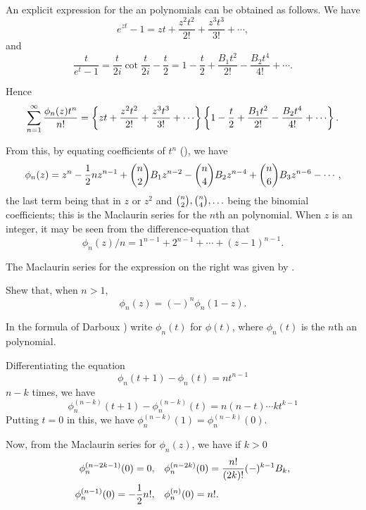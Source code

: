 An explicit expression for the \Bernoulli an polynomials can be obtained
as follows. We have
$$
e^{zt} - 1
=
zt
+ \frac{z^{2}t^{2}}{2!}
+ \frac{z^{3}t^{3}}{3!}
+ \cdots,
$$
and
$$
\frac{t}{e^{t}-1}
=
\frac{t}{2i} \cot \frac{t}{2i} - \frac{t}{2}
=
1
- \frac{t}{2}
+ \frac{B_{1} t^{2}}{2!}
- \frac{B_{2} t^{4}}{4!}
+ \cdots.
$$

Hence
$$
\sum_{n=1}^{\infty}
\frac{\phi_{n}(z) t^{n}}{n!}
=
\thebrace{
  zt
  + \frac{z^{2} t^{2}}{2!}
  + \frac{z^{3} t^{3}}{3!}
  + \cdots
}
\thebrace{
  1
  - \frac{t}{2}
  + \frac{B_{1} t^{2}}{2!}
  - \frac{B_{2} t^{4}}{4!}
  + \cdots
}.
$$

From this, by equating coefficients of $t^{n}$
(), we have
$$
\phi_{n}(z)
=
z^{n}
- \frac{1}{2} n z^{n-1}
+ \binom{n}{2} B_{1} z^{n-2}
- \binom{n}{4} B_{2} z^{n-4}
+ \binom{n}{6} B_{3} z^{n-6}
- \cdots,
$$
the last term being that in $z$ or $z^{2}$ and
$\binom{n}{2}, \binom{n}{4},\ldots$  being the
binomial coefficients; this is the Maclaurin series for the $n$th
\Bernoulli an polynomial.
When $z$ is an integer, it may be seen from the difference-equation that
$$
\phi_{n}(z)/n
=
1^{n-1}
+ 2^{n-1}
+ \cdots + (z-1)^{n-1}.
$$

The Maclaurin series for the
expression on the right was given by \Bernoulli.

\begin{wandwexample}
  Shew that, when $n > 1$,
  $$
  \phi_{n}(z) = (-)^{n} \phi_{n}(1-z).
  $$
\end{wandwexample}

In the formula of Darboux ) write $\phi_{n}(t)$
for $\phi(t)$, where $\phi_{n}(t)$ is the $n$th \Bernoulli an polynomial.

Differentiating the equation
$$
\phi_{n}(t+1) - \phi_{n}(t) = n t^{n-1}
$$
$n - k$ times, we have
$$
\phi_{n}^{(n-k)}(t+1) - \phi_{n}^{(n-k)}(t)
=
n (n-t) \cdots k t^{k-1}
$$
Putting $t=0$ in this, we have
$\phi_{n}^{(n-k)}(1) = \phi_{n}^{(n-k)}(0).$

Now, from the Maclaurin
series for $\phi_{n}(z)$, we have if $k > 0$
\begin{align*}
  \phi_{n}^{(n-2k-1)}(0) = 0,
  &
  \quad
  \phi_{n}^{(n-2k)}(0) = \frac{n!}{(2k)!} (-)^{k-1} B_{k},
  \\
  \phi_{n}^{(n-1)}(0) = -\frac{1}{2} n!,
  &
  \quad
  \phi_{n}^{(n)}(0) = n!.
\end{align*}

